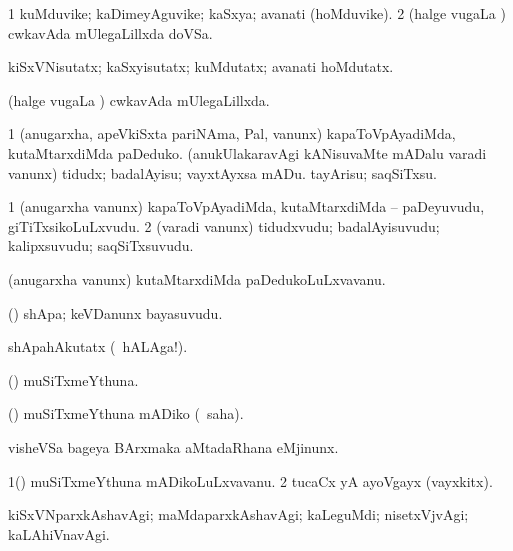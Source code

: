 {\bentry
{} 
\gl{\nA}
\expl{}
\bmng
\bnum
\num{1} kuMduvike; kaDimeyAguvike; kaSxya; avanati (hoMduvike). 
\num{2} (halge \mo vugaLa \vi) cwkavAda mUlegaLillxda doVSa. 
\enum
\emng

\noindent 
\gl{\pagu}
\expl{}
\bmng
{} kiSxVNisutatx; kaSxyisutatx; kuMdutatx; avanati hoMdutatx. 
\emng
\eentry

\bentry
{} 
\gl{\gu}
\expl{}
\bmng
(halge \mo vugaLa \vi) cwkavAda mUlegaLillxda. 
\emng
\eentry

\bentry
{} 
\gl{\sakirx}
\expl{}
\bmng
\bnum
\num{1} (anugarxha, apeVkiSxta pariNAma, Pal, \mo vanunx) kapaToVpAyadiMda, kutaMtarxdiMda paDeduko. 
 (anukUlakaravAgi kANisuvaMte mADalu varadi \mo vanunx) 
\banum
{} tidudx; badalAyisu; vayxtAyxsa mADu. 
 tayArisu; saqSiTxsu. 
\eanum
\numie
\enum
\emng
\eentry

\bentry
{} 
\gl{\nA}
\expl{}
\bmng
\bnum
\num{1} (anugarxha \mo vanunx) kapaToVpAyadiMda, kutaMtarxdiMda -- paDeyuvudu, giTiTxsikoLuLxvudu. 
\num{2} (varadi \mo vanunx) tidudxvudu; badalAyisuvudu; kalipxsuvudu; saqSiTxsuvudu. 
\enum
\emng
\eentry

\bentry
{} 
\gl{\nA}
\expl{}
\bmng
(anugarxha \mo vanunx) kutaMtarxdiMda paDedukoLuLxvavanu. 
\emng
\eentry

\bentry
{} 
\gl{\nA}
\expl{}
\bmng
(\pArxparx) shApa; keVDanunx bayasuvudu. 
\emng

\noindent 
\gl{\pagu}
\expl{}
\bmng
{} shApahAkutatx (\udA\ hALAga!). 
\emng
\eentry

\bentry
{} 
\gl{\nA}
\expl{}
\bmng
(\ashi) muSiTxmeYthuna. 
\emng
\eentry

\bentry
{} 
\gl{\akirx}
\expl{}
\bmng
(\ashi) muSiTxmeYthuna mADiko (\sakirx\ saha). 
\emng
\eentry

\bentry
{} 
\gl{\nA}
\expl{}
\bmng
visheVSa bageya BArxmaka aMtadaRhana eMjinunx. 
\emng
\eentry

\bentry
{} 
\gl{\nA}
\expl{}
\bmng
\bnum
\num{1}(\ashi) muSiTxmeYthuna mADikoLuLxvavanu. 
\num{2} tucaCx yA ayoVgayx (vayxkitx). 
\enum
\emng
\eentry

\bentry
{} 
\gl{\kirxvi}
\expl{}
\bmng
kiSxVNparxkAshavAgi; maMdaparxkAshavAgi; kaLeguMdi; nisetxVjvAgi; kaLAhiVnavAgi. 
\emng
\eentry

}

